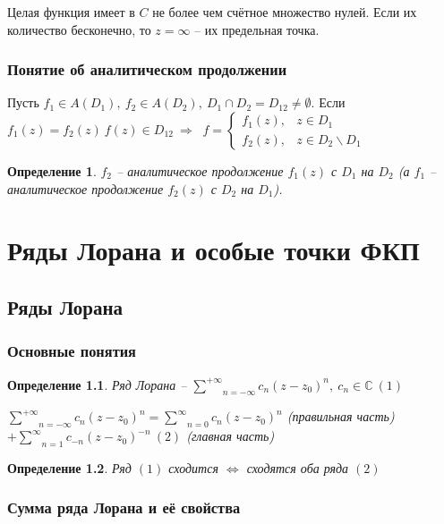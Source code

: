 \documentclass[draft]{report}
\newcommand{\then}{\ \Rightarrow\ }
\renewcommand{\C}{\mathbb{C}}
\newcommand{\msum}[2]{\underset{#1}{\overset{#2}{\sum}}}
\newcommand{\rsum}{\msum{n=1}{\infty}}
\newcommand{\ssum}{\msum{n=0}{\infty}}
\newcommand{\lsum}{\msum{n=-\infty}{+\infty}}
\newcommand{\LRA}{\Leftrightarrow}
\newcommand{\sys}[1]{\left\{\begin{matrix}#1\end{matrix}\right.}
\newcommand{\opr}[1]{\begin{opred}#1\end{opred}}
\newtheorem*{opred}{Определение}
\theoremstyle{remark}
\begin{document}
Целая функция имеет в $C$ не более чем счётное множество нулей. Если их количество бесконечно, то $z=\infty$ -- их предельная точка.

\subsection{Понятие об аналитическом продолжении}

Пусть $f_1\in A(D_1),\ f_2\in A(D_2),\ D_1\cap D_2=D_{12}\neq\emptyset$. Если $f_1(z)=f_2(z)\ f(z)\in D_{12}\then$
$f=\sys{f_1(z),&z\in D_1 \\ f_2(z),&z\in D_2\smallsetminus D_1}$

\opr{$f_2$ -- аналитическое продолжение $f_1(z)$ с $D_1$ на $D_2$ (а $f_1$ -- аналитическое продолжение $f_2(z)$ с $D_2$ на $D_1$).}

\chapter{Ряды Лорана и особые точки ФКП}

\section{Ряды Лорана}

\subsection{Основные понятия}

\opr{Ряд Лорана -- $\lsum c_n(z-z_0)^n,\ c_n\in\C\ (1)$

$\lsum c_n(z-z_0)^n=\ssum c_n(z-z_0)^n$ (правильная часть) $+\rsum c_{-n}(z-z_0)^{-n}\ (2)$ (главная часть)}

\opr{Ряд $(1)$ сходится $\LRA$ сходятся оба ряда $(2)$}

\subsection{Сумма ряда Лорана и её свойства}
\end{document}
